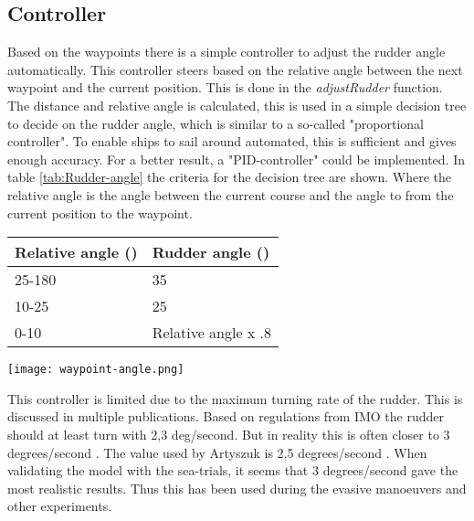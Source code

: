 \subsection{Controller}
Based on the waypoints there is a simple controller to adjust the rudder angle automatically. This controller steers based on the relative angle between the next waypoint and the current position. This is done in the \emph{adjustRudder} function. The distance and relative angle is calculated, this is used in a simple decision tree to decide on the rudder angle, which is similar to a so-called "proportional controller". To enable ships to sail around automated, this is sufficient and gives enough accuracy. For a better result, a "PID-controller" could be implemented. In table \ref{tab:Rudder-angle} the criteria for the decision tree are shown. Where the relative angle is the angle between the current course and the angle to from the current position to the waypoint. 

\begin{minipage}{\textwidth}
	\begin{minipage}[b]{0.52\textwidth}
	\centering
	\begin{tabular}{l|l}
		\toprule
		Relative angle (\degree) & Rudder angle (\degree) \\
		\midrule
		25-180 & 35\\
		10-25 & 25\\
		0-10 & Relative angle x .8 \\
		\bottomrule
	\end{tabular}
	
	\label{tab:Rudder-angle}
	\end{minipage}
	\hfill
	\begin{minipage}[b]{0.47\textwidth}
		\centering
		\texttt{[image: waypoint-angle.png]}
		\label{fig:waypoint-angle}
	\end{minipage}
\end{minipage}

This controller is limited due to the maximum turning rate of the rudder. This is discussed in multiple publications. Based on regulations from IMO the rudder should at least turn with 2,3 deg/second. But in reality this is often closer to 3 degrees/second \cite{Molland2007}. The value used by Artyszuk is 2,5 degrees/second \cite{Artyszuk2016}. When validating the model with the sea-trials, it seems that 3 degrees/second gave the most realistic results. Thus this has been used during the evasive manoeuvers and other experiments.



